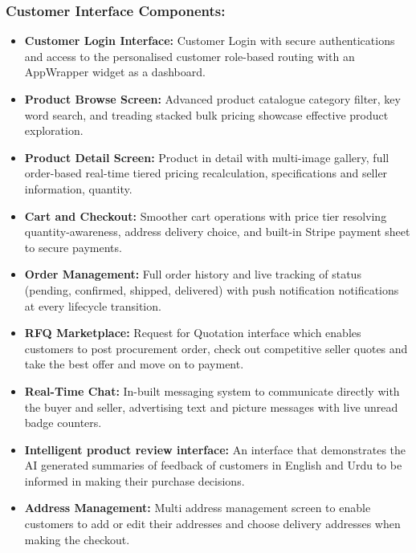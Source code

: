 \subsubsection{Customer Interface Components:}
\begin{itemize}
    \item \textbf{Customer Login Interface:} Customer Login with secure authentications and access to the personalised customer role-based routing with an AppWrapper widget as a dashboard.
    \item \textbf{Product Browse Screen:} Advanced product catalogue category filter, key word search, and treading stacked bulk pricing showcase effective product exploration.
    \item \textbf{Product Detail Screen:} Product in detail with multi-image gallery, full order-based real-time tiered pricing recalculation, specifications and seller information, quantity.
    \item \textbf{Cart and Checkout:} Smoother cart operations with price tier resolving quantity-awareness, address delivery choice, and built-in Stripe payment sheet to secure payments.
   \item \textbf{Order Management:} Full order history and live tracking of status (pending, confirmed, shipped, delivered) with push notification notifications at every lifecycle transition.
   \item \textbf{RFQ Marketplace:} Request for Quotation interface which enables customers to post procurement order, check out competitive seller quotes and take the best offer and move on to payment.
   \item \textbf{Real-Time Chat:} In-built messaging system to communicate directly with the buyer and seller, advertising text and picture messages with live unread badge counters.
  \item \textbf{Intelligent product review interface:} An interface that demonstrates the AI generated summaries of feedback of customers in English and Urdu to be informed in making their purchase decisions.
  \item \textbf{Address Management:} Multi address management screen to enable customers to add or edit their addresses and choose delivery addresses when making the checkout.
\end{itemize}

